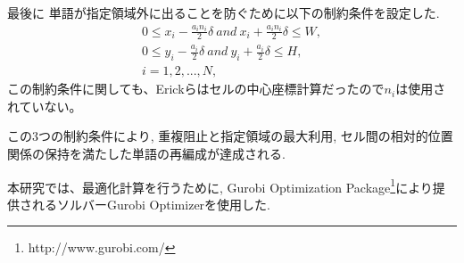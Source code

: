 \documentclass[syuuron]{kuee}
\begin{document}
				最後に 単語が指定領域外に出ることを防ぐために以下の制約条件を設定した.
				\begin{eqnarray}
					0 \le x_i  -  \frac{a_i n_i} {2} \delta \:  and \:  x_i  +  \frac{a_i n_i} {2} \delta \le W, \nonumber \\
					0 \le y_i  -  \frac{a_i} {2} \delta  \: and \:  y_i  +  \frac{a_i} {2} \delta \le H ,\\
					i = 1, 2, ...,N, \nonumber
				\end{eqnarray}
				この制約条件に関しても、Erickらはセルの中心座標計算だったので$n_i$は使用されていない。
				
				この3つの制約条件により, 重複阻止と指定領域の最大利用, セル間の相対的位置関係の保持を満たした単語の再編成が達成される. 
				
				本研究では、最適化計算を行うために, 
				Gurobi Optimization Package\footnote{http://www.gurobi.com/}により提供されるソルバーGurobi Optimizerを使用した.
	
\end{document}
